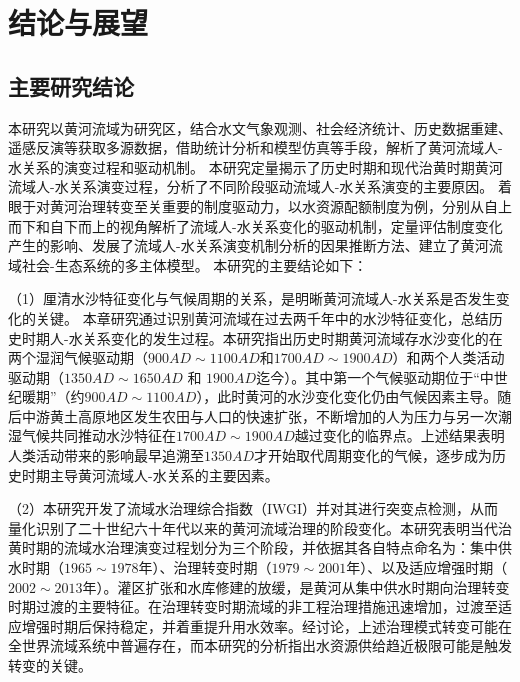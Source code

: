 \chapter{结论与展望}

\section{主要研究结论}

本研究以黄河流域为研究区，结合水文气象观测、社会经济统计、历史数据重建、遥感反演等获取多源数据，借助统计分析和模型仿真等手段，解析了黄河流域人-水关系的演变过程和驱动机制。
本研究定量揭示了历史时期和现代治黄时期黄河流域人-水关系演变过程，分析了不同阶段驱动流域人-水关系演变的主要原因。
着眼于对黄河治理转变至关重要的制度驱动力，以水资源配额制度为例，分别从自上而下和自下而上的视角解析了流域人-水关系变化的驱动机制，定量评估制度变化产生的影响、发展了流域人-水关系演变机制分析的因果推断方法、建立了黄河流域社会-生态系统的多主体模型。
本研究的主要结论如下：

（1）厘清水沙特征变化与气候周期的关系，是明晰黄河流域人-水关系是否发生变化的关键。
本章研究通过识别黄河流域在过去两千年中的水沙特征变化，总结历史时期人-水关系变化的发生过程。本研究指出历史时期黄河流域存水沙变化的在两个湿润气候驱动期（$900AD\sim1100AD$和$1700AD\sim1900AD$）和两个人类活动驱动期（$1350AD \sim 1650AD$ 和 $1900AD$迄今）。其中第一个气候驱动期位于“中世纪暖期”（约$900AD \sim 1100AD$），此时黄河的水沙变化变化仍由气候因素主导。随后中游黄土高原地区发生农田与人口的快速扩张，不断增加的人为压力与另一次潮湿气候共同推动水沙特征在$1700AD \sim 1900AD$越过变化的临界点。上述结果表明人类活动带来的影响最早追溯至$1350AD$才开始取代周期变化的气候，逐步成为历史时期主导黄河流域人-水关系的主要因素。

（2）本研究开发了流域水治理综合指数（IWGI）并对其进行突变点检测，从而量化识别了二十世纪六十年代以来的黄河流域治理的阶段变化。本研究表明当代治黄时期的流域水治理演变过程划分为三个阶段，并依据其各自特点命名为：集中供水时期（$1965 \sim 1978$年）、治理转变时期（$1979 \sim 2001$年）、以及适应增强时期（$2002 \sim 2013$年）。灌区扩张和水库修建的放缓，是黄河从集中供水时期向治理转变时期过渡的主要特征。在治理转变时期流域的非工程治理措施迅速增加，过渡至适应增强时期后保持稳定，并着重提升用水效率。经讨论，上述治理模式转变可能在全世界流域系统中普遍存在，而本研究的分析指出水资源供给趋近极限可能是触发转变的关键。

